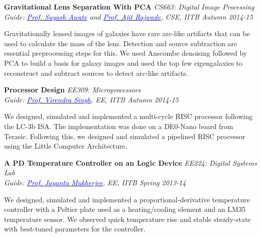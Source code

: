 \documentclass[margin,line]{res}
\newenvironment{list1}{
  \begin{list}{\ding{113}}{%
      \setlength{\itemsep}{0in}
      \setlength{\parsep}{0in} \setlength{\parskip}{0in}
      \setlength{\topsep}{0in} \setlength{\partopsep}{0in} 
      \setlength{\leftmargin}{0.17in}}}{\end{list}}
\begin{document}
\begin{resume}
\vspace*{-0.1in}

{\bf Gravitational Lens Separation With PCA} \hfill \textit{CS663: Digital Image Processing} \\
{\em Guide: \href{https://www.cse.iitb.ac.in/~suyash}{\textcolor{blue}{Prof. Suyash Awate}} and \href{https://www.cse.iitb.ac.in/~ajitvr}{\textcolor{blue}{Prof. Ajit Rajwade}}, CSE, IITB \hfill Autumn 2014-15} \\
\vspace*{-.15in}
\begin{list1}
\item[] Gravitationally lensed images of galaxies have rare arc-like artifacts that can be used to calculate the mass of the lens. Detection and source subtraction are essential preprocessing steps for this. We used Anscombe denoising followed by PCA to build a basis for galaxy images and used the top few eigengalaxies to reconstruct and subtract sources to detect arc-like artifacts.
\end{list1}

\vspace*{-0.1in}

{\bf Processor Design} \hfill \textit{EE309: Microprocessors} \\
{\em Guide: \href{https://www.ee.iitb.ac.in/~viren/}{\textcolor{blue}{Prof. Virendra Singh}}, EE, IITB \hfill Autumn 2014-15} \\
\vspace*{-.15in}
\begin{list1}
\item[] We designed, simulated and implemented a multi-cycle RISC processor following the LC-3b ISA. The implementation was done on a DE0-Nano board from Terasic. Following this, we designed and simulated a pipelined RISC processor using the Little Computer Architecture.
\end{list1}

\vspace*{-0.1in}

{\bf A PD Temperature Controller on an Logic Device} \hfill \textit{EE224: Digital Systems Lab} \\
{\em Guide: \href{https://www.ee.iitb.ac.in/wiki/faculty/jayanta}{\textcolor{blue}{Prof. Jayanta Mukherjee}}, EE, IITB \hfill Spring 2013-14} \\
\vspace*{-.15in}
\begin{list1}
\item[] We designed, simulated and implemented a proportional-derivative temperature controller with a Peltier plate used as a heating/cooling element and an LM35 temperature sensor. We observed quick temperature rise and stable steady-state with best-tuned parameters for the controller.
\end{list1}


\end{resume}
\end{document}
